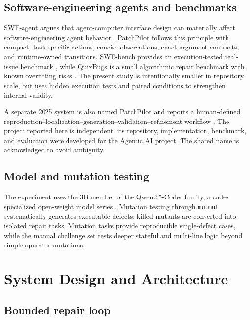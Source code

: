 \documentclass[11pt,a4paper]{article}
\newcommand{\code}[1]{\texttt{#1}}
\begin{document}
\subsection{Software-engineering agents and benchmarks}

SWE-agent argues that agent-computer interface design can materially affect
software-engineering agent behavior \cite{sweagent}. PatchPilot follows this
principle with compact, task-specific actions, concise observations, exact
argument contracts, and runtime-owned transitions. SWE-bench provides an
execution-tested real-issue benchmark \cite{swebench}, while QuixBugs is a
small algorithmic repair benchmark with known overfitting risks
\cite{quixbugs}. The present study is intentionally smaller in repository
scale, but uses hidden execution tests and paired conditions to strengthen
internal validity.

A separate 2025 system is also named PatchPilot and reports a human-defined
reproduction--localization--generation--validation--refinement workflow
\cite{externalpatchpilot}. The project reported here is independent:
its repository, implementation, benchmark, and evaluation were developed for the
Agentic AI project. The shared name is acknowledged to avoid ambiguity.

\subsection{Model and mutation testing}

The experiment uses the 3B member of the Qwen2.5-Coder family, a code-specialized
open-weight model series \cite{qwen}. Mutation testing through \code{mutmut}
systematically generates executable defects; killed mutants are converted into
isolated repair tasks. Mutation tasks provide reproducible single-defect cases,
while the manual challenge set tests deeper stateful and multi-line logic beyond
simple operator mutations.

\clearpage
\section{System Design and Architecture}

\subsection{Bounded repair loop}
\end{document}
